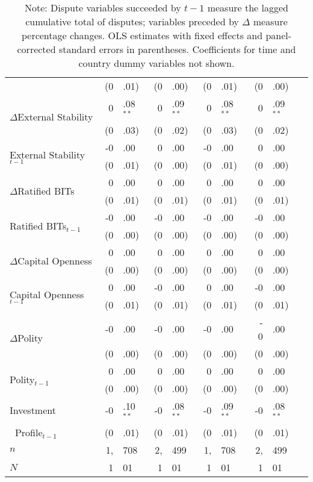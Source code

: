 \documentclass[12pt,onesided]{amsart}
\begin{document}
\begin{table}[ht]
{\begin{tabular}{lr@{} lr@{}lr@{}lr@{}lr@{}}
  & (0&.01) &  (0&.00) &  (0&.01) &  (0&.00) \\
  \multirow{2}{*}{$\Delta$External Stability} & 0&.08$^{\ast\ast}$ & 0&.09$^{\ast\ast}$ &  0&.08$^{\ast\ast}$ &  0&.09$^{\ast\ast}$ \\
  & (0&.03) &  (0&.02) &  (0&.03) &  (0&.02) \\
  \multirow{2}{*}{External Stability$_{t-1}$} & -0&.00 &  0&.00 &  -0&.00 &  0&.00 \\
  & (0&.01) &  (0&.00) &  (0&.01) &  (0&.00) \\
  \multirow{2}{*}{$\Delta$Ratified BITs} & 0&.00 &  0&.00 &  0&.00 &  0&.00 \\
  & (0&.01) &  (0&.01) &  (0&.01) &  (0&.01) \\
  \multirow{2}{*}{Ratified BITs$_{t-1}$} & -0&.00 & -0&.00 &  -0&.00 & -0&.00 \\
  & (0&.00) & (0&.00) &  (0&.00) &  (0&.00) \\
  \multirow{2}{*}{$\Delta$Capital Openness} & 0&.00 & 0&.00 &  0&.00 &  0&.00 \\
  & (0&.00) &  (0&.00) &  (0&.00) &  (0&.00) \\
  \multirow{2}{*}{Capital Openness$_{t-1}$} & 0&.00 & -0&.00 &  0&.00 &  -0&.00 \\
  & (0&.01) & (0&.01) & (0&.01) & (0&.01) \\
  \multirow{2}{*}{$\Delta$Polity} & -0&.00 & -0&.00 &  -0&.00 & - 0&.00  \\
  & (0&.00) & (0&.00) &  (0&.00) &  (0&.00) \\
  \multirow{2}{*}{Polity$_{t-1}$} & 0&.00 & 0&.00 &  0&.00 &  0&.00 \\
  & (0&.00) & (0&.00) &  (0&.00) &  (0&.00) \\
    Investment & -0&.10$^{\ast\ast}$ & -0&.08$^{\ast\ast}$ & -0&.09$^{\ast\ast}$ & -0&.08$^{\ast\ast}$ \\
  $\;\;$Profile$_{t-1}$ & (0&.01) & (0&.01) & (0&.01) & (0&.01) \\
	\hline
	$n$ & 1,&708 & 2,&499 & 1,&708 & 2,&499 \\
	$N$ & 1&01 & 1&01 & 1&01 & 1&01 \\
	\hline\hline
\end{tabular}
\caption*{Note: Dispute variables succeeded by ${t-1}$ measure the lagged cumulative total of disputes; variables preceded by $\Delta$ measure percentage changes. OLS estimates with fixed effects and panel-corrected standard errors in parentheses. Coefficients for time and country dummy variables not shown.}
}
\end{table}
\FloatBarrier
\end{document}

